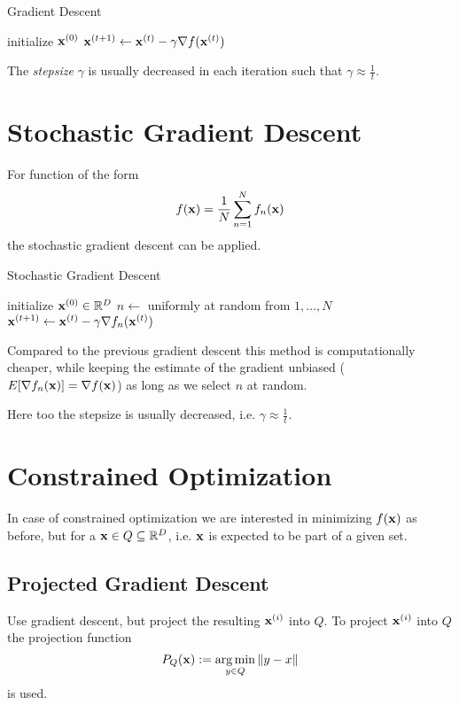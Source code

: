 \begin{algorithm}[H]
\caption{Gradient Descent}
\begin{algorithmic}[1]
\State initialize \(\boldsymbol{\mathrm{x}}^{(0)}\)
	\State \(\boldsymbol{\mathrm{x}}^{(t+1)} \gets \boldsymbol{\mathrm{x}}^{(t)} - \gamma \nabla f(\boldsymbol{\mathrm{x}}^{(t)})\)
\EndFor
\EndProcedure
\end{algorithmic}
\end{algorithm}

The \emph{stepsize} \(\gamma\) is usually decreased in each iteration such that \(\gamma \approx \frac{1}{t}\).

\section{Stochastic Gradient Descent}
For function of the form
\[
f(\boldsymbol{\mathrm{x}}) = \frac{1}{N} \sum_{n=1}^N f_n(\boldsymbol{\mathrm{x}})
\]
the stochastic gradient descent can be applied.

\begin{algorithm}[H]
\caption{Stochastic Gradient Descent}
\begin{algorithmic}[1]
\State initialize \(\boldsymbol{\mathrm{x}}^{(0)} \in \mathbb{R}^D\)
	\State \(n \gets\) uniformly at random from \(1, \ldots, N\)
	\State \(\boldsymbol{\mathrm{x}}^{(t+1)} \gets \boldsymbol{\mathrm{x}}^{(t)} - \gamma \nabla f_n(\boldsymbol{\mathrm{x}}^{(t)})\)
\EndFor
\EndProcedure
\end{algorithmic}
\end{algorithm}

Compared to the previous gradient descent this method is computationally cheaper, while keeping the estimate of the gradient unbiased (\( E[\nabla f_n(\boldsymbol{\mathrm{x}})] = \nabla f(\boldsymbol{\mathrm{x}}) \)) as long as we select \(n\) at random.

Here too the stepsize is usually decreased, i.e. \(\gamma \approx \frac{1}{t}\).

\section{Constrained Optimization}
In case of constrained optimization we are interested in minimizing \(f(\boldsymbol{\mathrm{x}})\) as before, but for a \(\boldsymbol{\mathrm{x}} \in Q \subseteq \mathbb{R}^D\), i.e. \(\boldsymbol{\mathrm{x}}\) is expected to be part of a given set.

\subsection{Projected Gradient Descent}
Use gradient descent, but project the resulting \(\boldsymbol{\mathrm{x}}^{(i)}\) into \(Q\). To project \(\boldsymbol{\mathrm{x}}^{(i)}\) into \(Q\) the projection function
\[
P_Q(\boldsymbol{\mathrm{x}}) := \operatorname*{arg\,min}_{y \in Q} \|y - x\|
\]
is used.

